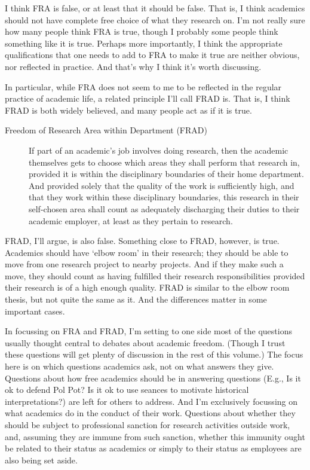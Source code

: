 \documentclass[
  11pt,
  letterpaper,
  DIV=11,
  numbers=noendperiod,
  twoside]{scrartcl}
\begin{document}
I think FRA is false, or at least that it should be false. That is, I
think academics should not have complete free choice of what they
research on. I'm not really sure how many people think FRA is true,
though I probably some people think something like it is true. Perhaps
more importantly, I think the appropriate qualifications that one needs
to add to FRA to make it true are neither obvious, nor reflected in
practice. And that's why I think it's worth discussing.

In particular, while FRA does not seem to me to be reflected in the
regular practice of academic life, a related principle I'll call FRAD
is. That is, I think FRAD is both widely believed, and many people act
as if it is true.

\begin{description}
\item[Freedom of Research Area within Department (FRAD)]
If part of an academic's job involves doing research, then the academic
themselves gets to choose which areas they shall perform that research
in, provided it is within the disciplinary boundaries of their home
department. And provided solely that the quality of the work is
sufficiently high, and that they work within these disciplinary
boundaries, this research in their self-chosen area shall count as
adequately discharging their duties to their academic employer, at least
as they pertain to research.
\end{description}

FRAD, I'll argue, is also false. Something close to FRAD, however, is
true. Academics should have `elbow room' in their research; they should
be able to move from one research project to nearby projects. And if
they make such a move, they should count as having fulfilled their
research responsibilities provided their research is of a high enough
quality. FRAD is similar to the elbow room thesis, but not quite the
same as it. And the differences matter in some important cases.

In focussing on FRA and FRAD, I'm setting to one side most of the
questions usually thought central to debates about academic freedom.
(Though I trust these questions will get plenty of discussion in the
rest of this volume.) The focus here is on which questions academics
ask, not on what answers they give. Questions about how free academics
should be in answering questions (E.g., Is it ok to defend Pol Pot? Is
it ok to use seances to motivate historical interpretations?) are left
for others to address. And I'm exclusively focussing on what academics
do in the conduct of their work. Questions about whether they should be
subject to professional sanction for research activities outside work,
and, assuming they are immune from such sanction, whether this immunity
ought be related to their status as academics or simply to their status
as employees are also being set aside.
\end{document}
